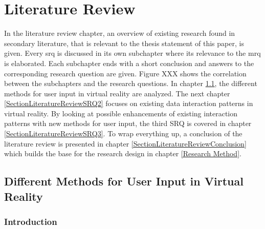 
\chapter{Literature Review} %

\label{ChapterLiteratureReview} %

In the literature review chapter, an overview of existing research found in secondary literature, that is relevant to the thesis statement of this paper, is given. Every \gls{srq} is discussed in its own subchapter where its relevance to the \gls{mrq} is elaborated. Each subchapter ends with a short conclusion and answers to the corresponding research question are given.
Figure XXX shows the correlation between the subchapters and the research questions. In chapter \ref{SectionLiteratureReviewSRQ1}, the different methods for user input in virtual reality are analyzed. The next chapter \ref{SectionLiteratureReviewSRQ2} focuses on existing data interaction patterns in virtual reality. By looking at possible enhancements of existing interaction patterns with new methods for user input, the third SRQ is covered in chapter \ref{SectionLiteratureReviewSRQ3}. To wrap everything up, a conclusion of the literature review is presented in chapter \ref{SectionLiteratureReviewConclusion} which builds the base for the research design in chapter \ref{Research Method}.




\section{Different Methods for User Input in Virtual Reality}

\label{SectionLiteratureReviewSRQ1}

\subsection{Introduction}

